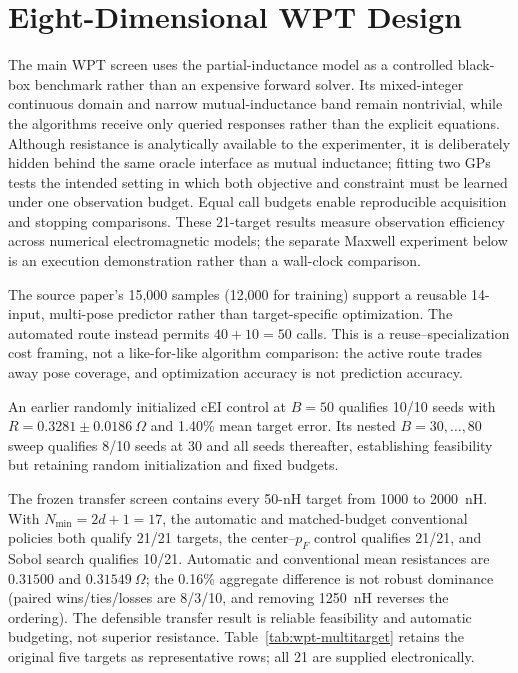 \documentclass[conference]{IEEEtran}
\begin{document}
\section{Eight-Dimensional WPT Design}
The main WPT screen uses the partial-inductance model as a controlled black-box benchmark rather than an expensive forward solver. Its mixed-integer continuous domain and narrow mutual-inductance band remain nontrivial, while the algorithms receive only queried responses rather than the explicit equations. Although resistance is analytically available to the experimenter, it is deliberately hidden behind the same oracle interface as mutual inductance; fitting two GPs tests the intended setting in which both objective and constraint must be learned under one observation budget. Equal call budgets enable reproducible acquisition and stopping comparisons. These 21-target results measure observation efficiency across numerical electromagnetic models; the separate Maxwell experiment below is an execution demonstration rather than a wall-clock comparison.

The source paper's 15,000 samples (12,000 for training) support a reusable 14-input, multi-pose predictor rather than target-specific optimization. The automated route instead permits $40+10=50$ calls. This is a reuse--specialization cost framing, not a like-for-like algorithm comparison: the active route trades away pose coverage, and optimization accuracy is not prediction accuracy.

An earlier randomly initialized cEI control at $B=50$ qualifies 10/10 seeds with $R=0.3281\pm0.0186~\Omega$ and 1.40\% mean target error. Its nested $B=30,\ldots,80$ sweep qualifies 8/10 seeds at 30 and all seeds thereafter, establishing feasibility but retaining random initialization and fixed budgets.

The frozen transfer screen contains every 50-nH target from 1000 to 2000~nH. With $N_{\min}=2d+1=17$, the automatic and matched-budget conventional policies both qualify 21/21 targets, the center--$p_F$ control qualifies 21/21, and Sobol search qualifies 10/21. Automatic and conventional mean resistances are $0.31500$ and $0.31549~\Omega$; the 0.16\% aggregate difference is not robust dominance (paired wins/ties/losses are 8/3/10, and removing 1250~nH reverses the ordering). The defensible transfer result is reliable feasibility and automatic budgeting, not superior resistance. Table~\ref{tab:wpt-multitarget} retains the original five targets as representative rows; all 21 are supplied electronically.
\end{document}
